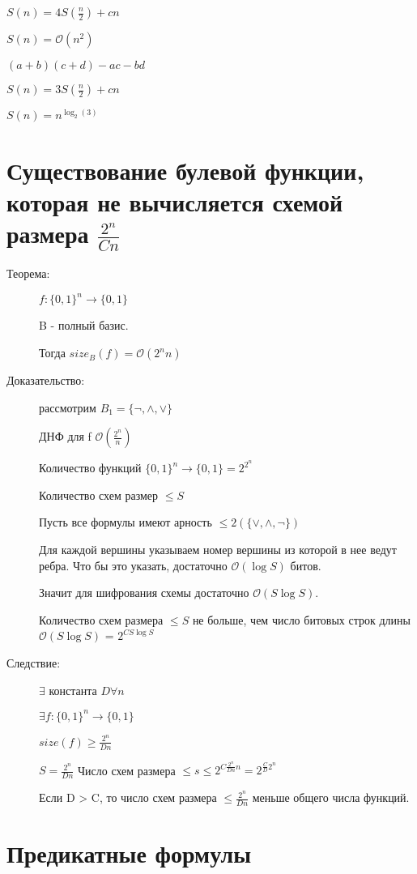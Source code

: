 \documentclass[12pt]{article}
\def\O{\mathcal{O}}
\begin{document}
$S(n) = 4S(\frac{n}{2}) + cn$

$S(n) = \O(n^2)$

$(a + b)(c + d) - ac - bd$

$S(n) = 3S(\frac{n}{2}) + cn$

$S(n)  = n^{\log_2(3)}$

\section{Существование булевой функции, которая не вычисляется схемой размера $\frac{2^n}{Cn}$}

\begin{description}
\item [Теорема:] $f:\{0, 1\}^n \to \{0, 1\}$

B - полный базис.

Тогда $size_B(f) = \O(2^nn)$

\item [Доказательство:] рассмотрим $B_1 = \{\neg, \wedge, \vee \}$

ДНФ для f $\O(\frac{2^n}{n})$

Количество функций $\{0, 1\}^n \to \{0, 1\} = 2^{2^n}$

Количество схем размер $\le S$

Пусть все формулы имеют арность $\le 2(\{\vee, \wedge, \neg\})$

Для каждой вершины указываем номер вершины из которой в нее ведут ребра.  Что бы это указать, достаточно $\O(\log S)$ битов.

Значит для шифрования схемы достаточно $\O(S \log S)$.

Количество схем размера $\le S$ не больше, чем число битовых строк длины $\O(S \log S)$ = $2^{CS\log S}$

\item[Следствие:]

$\exists$ константа $D \forall n$

$\exists f:\{0, 1\}^n \to \{0, 1\}$

$size(f) \ge \frac{2^n}{Dn}$

$S = \frac{2^n}{Dn}$ Число схем размера $\le s \le 2^{C\frac{2^n}{Dn}n} = 2^{\frac{C}{D}2^{n}}$

Если D > C, то число схем размера $\le \frac{2^n}{Dn}$ меньше общего числа функций.


\end{description}

\section{Предикатные формулы}
\end{document}
